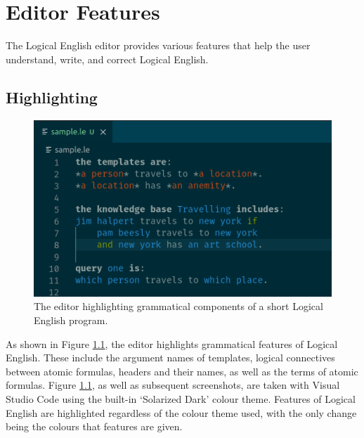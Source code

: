 \documentclass[../main.tex]{subfiles}
\begin{document}
\chapter{Editor Features}
\label{chapter:editor-featres}

The Logical English editor provides various features that help the user understand, write, and correct Logical English.
\section{Highlighting}
\begin{figure}[h!]
\centering
\includegraphics[width = \linewidth]{./figures/highlighting.png}
\caption{The editor highlighting grammatical components of a short Logical English program.}
\label{fig:highlighting}
\end{figure}
As shown in Figure \ref{fig:highlighting}, the editor highlights grammatical features of Logical English. These include the argument names of templates, logical connectives between atomic formulas, headers and their names, as well as the terms of atomic formulas. Figure \ref{fig:highlighting}, as well as subsequent screenshots, are taken with Visual Studio Code using the built-in `Solarized Dark' colour theme. Features of Logical English are highlighted regardless of the colour theme used, with the only change being the colours that features are given.
\end{document}
